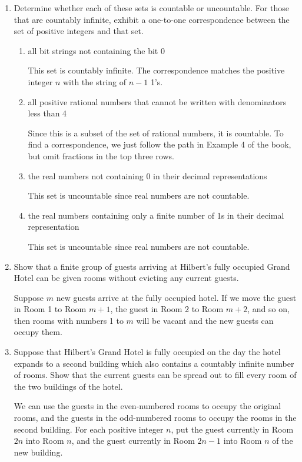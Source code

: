 \documentclass[11pt]{article}
\begin{document}
\begin{enumerate}[label=\textbf{\arabic*.}]
	\item Determine whether each of these sets is countable or uncountable. For those that are countably infinite, exhibit a one-to-one correspondence between the set of positive integers and that set.
	
	\begin{enumerate}[label=\textbf{\alph*)}]
		\item all bit strings not containing the bit 0
		
		This set is countably infinite. The correspondence matches the positive integer $n$ with the string of $n - 1$ 1's.
		
		\item all positive rational numbers that cannot be written with denominators less than 4
		
		Since this is a subset of the set of rational numbers, it is countable. To find a correspondence, we just follow the path in Example 4 of the book, but omit fractions in the top three rows.
		
		\item the real numbers not containing 0 in their decimal representations
		
		This set is uncountable since real numbers are not countable.
		
		\item the real numbers containing only a finite number of 1s in their decimal representation
		
		This set is uncountable since real numbers are not countable.
	\end{enumerate}

	\item Show that a finite group of guests arriving at Hilbert's fully occupied Grand Hotel can be given rooms without evicting any current guests.
	
	Suppose $m$ new guests arrive at the fully occupied hotel. If we move the guest in Room 1 to Room $m + 1$, the guest in Room 2 to Room $m + 2$, and so on, then rooms with numbers 1 to $m$ will be vacant and the new guests can occupy them.
	
	\item Suppose that Hilbert's Grand Hotel is fully occupied on the day the hotel expands to a second building which also contains a countably infinite number of rooms. Show that the current guests can be spread out to fill every room of the two buildings of the hotel.
	
	We can use the guests in the even-numbered rooms to occupy the original rooms, and the guests in the odd-numbered rooms to occupy the rooms in the second building. For each positive integer $n$, put the guest currently in Room $2n$ into Room $n$, and the guest currently in Room $2n - 1$ into Room $n$ of the new building.
	

\end{enumerate}
\end{document}
